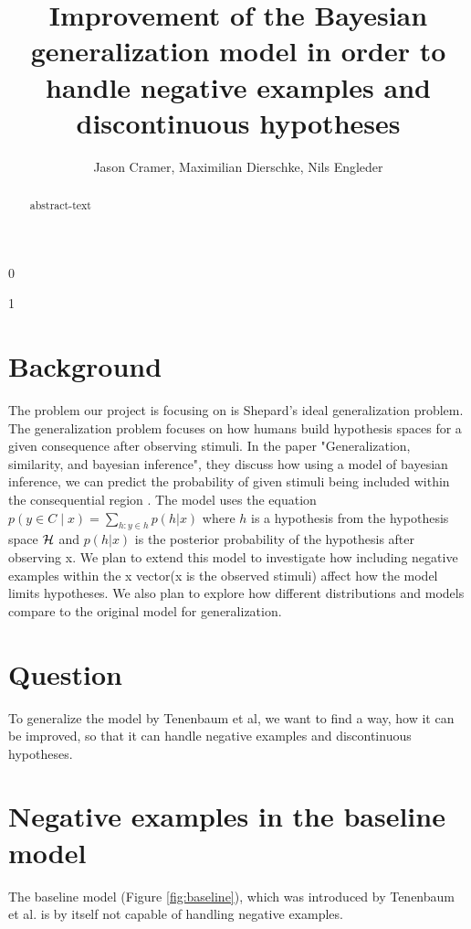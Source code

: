 \documentclass[12pt, ]{scrartcl}
\title{Improvement of the Bayesian generalization model in order to handle negative examples and discontinuous hypotheses}
\begin{document}
\def\isblind{1}
\if\isblind0
    \author{Jason Cramer, Maximilian Dierschke, Nils Engleder}\fi
\if \isblind1
    \author{}\fi

\maketitle
\begin{abstract}
	abstract-text
\end{abstract}
\doublespacing
\begin{multicols}{2}
\section{Background}
The problem our project is focusing on is Shepard's ideal generalization problem. The generalization problem focuses on how humans build hypothesis spaces for a given consequence after observing stimuli.
In the paper "Generalization, similarity, and bayesian inference", they discuss how using a model of bayesian inference, we can predict the probability of given stimuli being included within the consequential region \cite{Tenenbaum}.
The model uses the equation $p(y \in C \mid x) = \sum\limits_{h:y\in h} p(h | x)$ where $h$ is a hypothesis from the hypothesis space ${\cal H}$ and $p(h | x)$ is the posterior probability of  the hypothesis after observing x.
We plan to extend this model to investigate how including negative examples within the x vector(x is the observed stimuli) affect how the model limits hypotheses. We also plan to explore how different distributions and models compare to the original model for generalization.
\section{Question}
To generalize the model by Tenenbaum et al, we want to find a way, how it can be improved, so that it can handle negative examples and discontinuous hypotheses.

\section{Negative examples in the baseline model}
The baseline model (Figure \ref{fig:baseline}), which was introduced by Tenenbaum et al. is by itself not capable of handling negative examples.


\end{multicols}
\end{document}
